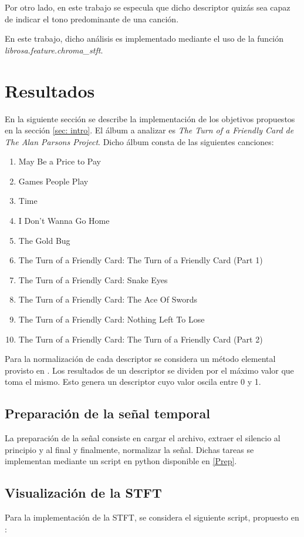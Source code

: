 \documentclass[]{article}
\begin{document}
\begin{multicols}{2}
Por otro lado, en este trabajo se especula que dicho descriptor quizás sea capaz de indicar el tono
predominante de una canción.

En este trabajo, dicho análisis es implementado mediante el uso de la función \emph{{librosa.feature.chroma\_stft}}.

\section{Resultados}
En la siguiente sección se describe la implementación de los objetivos propuestos
en la sección \ref{sec: intro}. El álbum a analizar es \emph{The Turn of a Friendly
Card  \emph{de} The Alan Parsons Project}. Dicho álbum consta de las siguientes
canciones:
\begin{enumerate}
  \item May Be a Price to Pay
  \item Games People Play
  \item Time
  \item I Don't Wanna Go Home
  \item The Gold Bug
  \item The Turn of a Friendly Card: The Turn of a Friendly Card (Part 1)
  \item The Turn of a Friendly Card: Snake Eyes
  \item The Turn of a Friendly Card: The Ace Of Swords
  \item The Turn of a Friendly Card: Nothing Left To Lose
  \item The Turn of a Friendly Card: The Turn of a Friendly Card (Part 2)
\end{enumerate}

Para la normalización de cada descriptor se considera un método elemental provisto
en \cite{witten2005data}. Los resultados de un descriptor se dividen
por el máximo valor que toma el mismo. Esto genera un descriptor cuyo valor
oscila entre 0 y 1.

\subsection{Preparación de la señal temporal}

\label{sec: prep}
La preparación de la señal consiste en cargar el archivo, extraer el silencio
al principio y al final y finalmente, normalizar la señal. Dichas tareas se
implementan mediante un script en python disponible en \ref{Prep}.

\subsection{Visualización de la STFT}
\label{sec: stft}
Para la implementación de la STFT, se considera el siguiente script, propuesto
en \cite{stft}:


\end{multicols}
\end{document}
